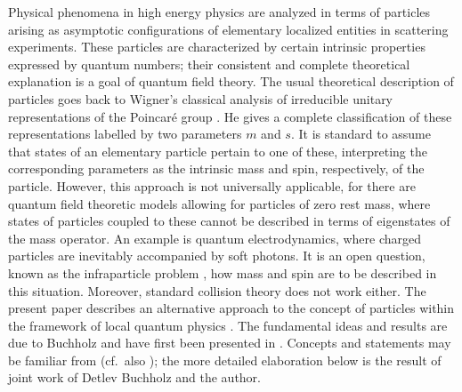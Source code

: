 \documentclass[a4paper,a4paper]{article}
\numberwithin{equation}{section}
\theoremstyle{definition}
\theoremstyle{plain}
\theoremstyle{remark}
\begin{document}
  Physical phenomena in high energy physics are analyzed in terms of
  particles arising as asymptotic configurations of elementary
  localized entities in scattering experiments. These particles are
  characterized by certain intrinsic properties expressed by quantum
  numbers; their consistent and complete theoretical explanation is a
  goal of quantum field theory. The usual theoretical description of
  particles goes back to Wigner's classical analysis of irreducible
  unitary representations of the Poincar\'e group \cite{wigner:1939}.
  He gives a complete classification of these representations labelled
  by two parameters $m$ and $s$. It is standard to assume that states
  of an elementary particle pertain to one of these, interpreting the
  corresponding parameters as the intrinsic mass and spin,
  respectively, of the particle. However, this approach is not
  universally applicable, for there are quantum field theoretic models
  allowing for particles of zero rest mass, where states of particles
  coupled to these cannot be described in terms of eigenstates of the
  mass operator. An example is quantum electrodynamics, where charged
  particles are inevitably accompanied by soft photons. It is an open
  question, known as the infraparticle problem \cite{schroer:1963},
  how mass and spin are to be described in this situation. Moreover,
  standard collision theory does not work either. The present paper
  describes an alternative approach to the concept of particles within
  the framework of local quantum physics
  \cite{haag/kastler:1964,haag:1996}. The fundamental ideas and
  results are due to Buchholz and have first been presented in
  \cite{buchholz:1986b}. Concepts and statements may be familiar from
  \cite{buchholz/porrmann/stein:1991} (cf.~also
  \cite[Section~VI.2.2]{haag:1996}); the more detailed elaboration
  below is the result of joint work of Detlev Buchholz and the author.
  
\end{document}
